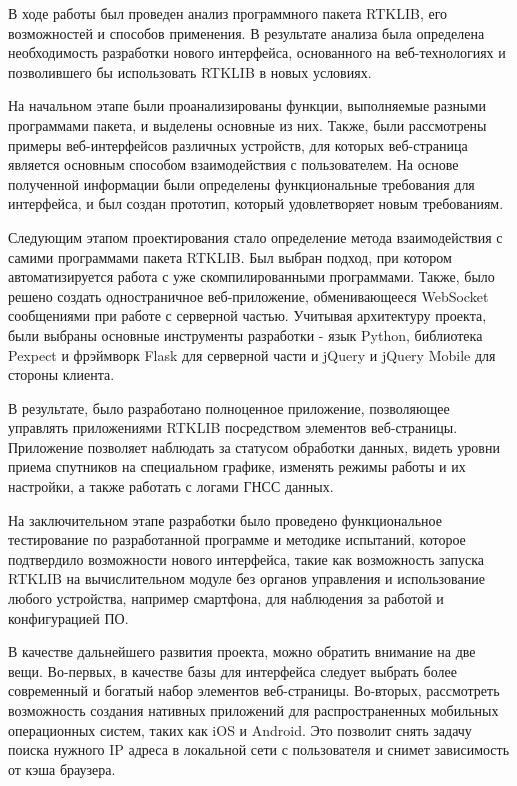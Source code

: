 \conclusion

В ходе работы был проведен анализ программного пакета RTKLIB, его возможностей и способов применения. В результате анализа была определена необходимость разработки нового интерфейса, основанного на веб-технологиях и позволившего бы использовать RTKLIB в новых условиях.

На начальном этапе были проанализированы функции, выполняемые разными программами пакета, и выделены основные из них. Также, были рассмотрены примеры веб-интерфейсов различных устройств, для которых веб-страница является основным способом взаимодействия с пользователем. На основе полученной информации были определены функциональные требования для интерфейса, и был создан прототип, который удовлетворяет новым требованиям.

Следующим этапом проектирования стало определение метода взаимодействия с самими программами пакета RTKLIB. Был выбран подход, при котором автоматизируется работа с уже скомпилированными программами. Также, было решено создать одностраничное веб-приложение, обменивающееся WebSocket сообщениями при работе с серверной частью. Учитывая архитектуру проекта, были выбраны основные инструменты разработки - язык Python, библиотека Pexpect и фрэймворк Flask для серверной части и jQuery и jQuery Mobile для стороны клиента.

В результате, было разработано полноценное приложение, позволяющее управлять приложениями RTKLIB посредством элементов веб-страницы. Приложение позволяет наблюдать за статусом обработки данных, видеть уровни приема спутников на специальном графике, изменять режимы работы и их настройки, а также работать с логами ГНСС данных.

На заключительном этапе разработки было проведено функциональное тестирование по разработанной программе и методике испытаний, которое подтвердило возможности нового интерфейса, такие как возможность запуска RTKLIB на вычислительном модуле без органов управления и использование любого устройства, например смартфона, для наблюдения за работой и конфигурацией ПО.

В качестве дальнейшего развития проекта, можно обратить внимание на две вещи. Во-первых, в качестве базы для интерфейса следует выбрать более современный и богатый набор элементов веб-страницы. Во-вторых, рассмотреть возможность создания нативных приложений для распространенных мобильных операционных систем, таких как iOS и Android. Это позволит снять задачу поиска нужного IP адреса в локальной сети с пользователя и снимет зависимость от кэша браузера.